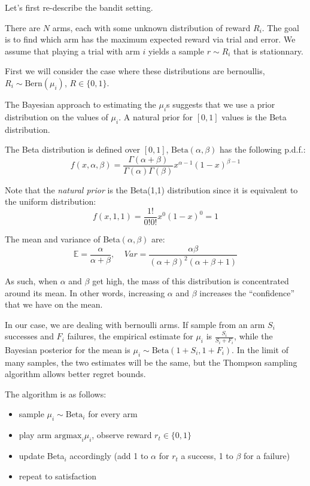 \documentclass[a4paper]{article}
\begin{document}
Let's first re-describe the bandit setting.

There are $N$ arms, each with some unknown distribution of reward $R_i$. The goal is to find which arm has the maximum expected reward via trial and error. We assume that playing a trial with arm $i$ yields a sample $r\sim R_i$ that is stationnary.

First we will consider the case where these distributions are bernoullis, $R_i\sim \mbox{Bern}(\mu_i)$, $R\in\{0,1\}$.

The Bayesian approach to estimating the $\mu_i$s suggests that we use a prior distribution on the values of $\mu_i$. A natural prior for $[0,1]$ values is the Beta distribution.

The Beta distribution is defined over $[0,1]$, $\mbox{Beta}(\alpha,\beta)$ has the following p.d.f.:
$$f(x,\alpha,\beta) = \frac {\Gamma(\alpha+\beta)}{\Gamma(\alpha)\Gamma(\beta)}x^{\alpha-1}(1-x)^{\beta-1}$$

Note that the \emph{natural prior} is the Beta(1,1) distribution since it is equivalent to the uniform distribution:
$$f(x,1,1) = \frac{1!}{0!0!}x^0(1-x)^0=1$$

The mean and variance of Beta$(\alpha, \beta)$ are:
$$\mathbb{E}=\frac{\alpha}{\alpha+\beta},\;\;\;\;Var=\frac{\alpha\beta}{(\alpha+\beta)^2(\alpha+\beta+1)}$$

As such, when $\alpha$ and $\beta$ get high, the mass of this distribution is concentrated around its mean. In other words, increasing $\alpha$ and $\beta$ increases the ``confidence'' that we have on the mean.

In our case, we are dealing with bernoulli arms. If sample from an arm $S_i$ successes and $F_i$ failures, the empirical estimate for $\mu_i$ is $\frac{S_i}{S_i+F_i}$, while the Bayesian posterior for the mean is $\mu_i \sim \mbox{Beta}(1+S_i,1+F_i)$. In the limit of many samples, the two estimates will be the same, but the Thompson sampling algorithm allows better regret bounds.

The algorithm is as follows:
\begin{itemize}
\item sample $\mu_i\sim \mbox{Beta}_i$ for every arm
\item play arm $\mbox{argmax}_i \mu_i$, observe reward $r_t\in\{0,1\}$
\item update Beta$_i$ accordingly (add 1 to $\alpha$ for $r_t$ a success, 1 to $\beta$ for a failure)
\item repeat to satisfaction
\end{itemize}
\end{document}

